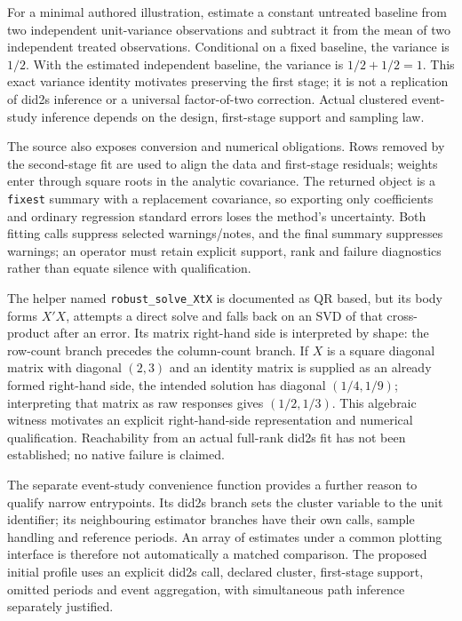 For a minimal authored illustration, estimate a constant untreated baseline
from two independent unit-variance observations and subtract it from the mean
of two independent treated observations. Conditional on a fixed baseline,
the variance is $1/2$. With the estimated independent baseline, the variance
is $1/2+1/2=1$. This exact variance identity motivates preserving the first
stage; it is not a replication of did2s inference or a universal factor-of-two
correction. Actual clustered event-study inference depends on the design,
first-stage support and sampling law.~\citep{exec24_panel_reuse_reference}

The source also exposes conversion and numerical obligations. Rows removed
by the second-stage fit are used to align the data and first-stage residuals;
weights enter through square roots in the analytic covariance. The returned
object is a \texttt{fixest} summary with a replacement covariance, so exporting
only coefficients and ordinary regression standard errors loses the method's
uncertainty. Both fitting calls suppress selected warnings/notes, and the
final summary suppresses warnings; an operator must retain explicit support,
rank and failure diagnostics rather than equate silence with qualification.
\citep{exec24_did2s_reuse_source}

The helper named \texttt{robust\_solve\_XtX} is documented as QR based, but its
body forms $X'X$, attempts a direct solve and falls back on an SVD of that
cross-product after an error. Its matrix right-hand side is interpreted by
shape: the row-count branch precedes the column-count branch. If $X$ is a
square diagonal matrix with diagonal $(2,3)$ and an identity matrix is supplied
as an already formed right-hand side, the intended solution has diagonal
$(1/4,1/9)$; interpreting that matrix as raw responses gives $(1/2,1/3)$.
This algebraic witness motivates an explicit right-hand-side representation
and numerical qualification. Reachability from an actual full-rank did2s
fit has not been established; no native failure is claimed.
\citep{exec24_did2s_reuse_source,exec24_panel_reuse_reference}

The separate event-study convenience function provides a further reason to
qualify narrow entrypoints. Its did2s branch sets the cluster variable to the
unit identifier; its neighbouring estimator branches have their own calls,
sample handling and reference periods. An array of estimates under a common
plotting interface is therefore not automatically a matched comparison.
The proposed initial profile uses an explicit did2s call, declared cluster,
first-stage support, omitted periods and event aggregation, with simultaneous
path inference separately justified.~\citep{exec24_did2s_reuse_source}

